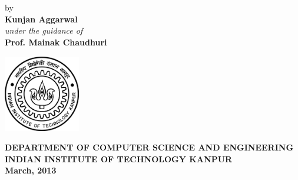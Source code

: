 \thispagestyle{empty}

\begin{center}
\\
\vspace{4mm}
\\

\vspace{55mm}
by\\
\vspace{5mm}
{\bf{\Large Kunjan Aggarwal}}\\
\vspace{10mm}
\emph{under the guidance of}\\
\vspace{5mm}
{\bf{\Large Prof. Mainak Chaudhuri}}\\
\vspace{25mm}

\begin{center}
\centering
\includegraphics[width=0.25\textwidth]{./Data/iitk}
\end{center}

\vspace{3mm}
{\bf {\large {\sc DEPARTMENT OF COMPUTER SCIENCE AND ENGINEERING}}}\\
\vspace{2mm}
{\bf {\large {\sc INDIAN INSTITUTE OF TECHNOLOGY KANPUR}}}\\
\vspace{3mm}
{\textbf{ March, 2013}}\\
\end{center}


